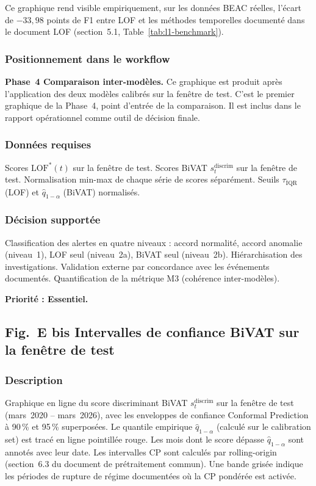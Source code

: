 \documentclass[12pt,a4paper]{article}
\begin{document}
Ce graphique rend visible empiriquement, sur les données BEAC réelles,
l'écart de $-33{,}98$ points de F1 entre LOF et les méthodes temporelles
documenté dans le document LOF (section~5.1, Table~\ref{tab:l1-benchmark}).

\subsubsection{Positionnement dans le workflow}

\textbf{Phase~4  Comparaison inter-modèles.} Ce graphique est produit
après l'application des deux modèles calibrés sur la fenêtre de test.
C'est le premier graphique de la Phase~4, point d'entrée de la comparaison.
Il est inclus dans le rapport opérationnel comme outil de décision finale.

\subsubsection{Données requises}

Scores $\mathrm{LOF}^*(t)$ sur la fenêtre de test. Scores BiVAT
$s^{\mathrm{discrim}}_t$ sur la fenêtre de test. Normalisation min-max
de chaque série de scores séparément. Seuils $\tau_{\mathrm{IQR}}$ (LOF)
et $\hat{q}_{1-\alpha}$ (BiVAT) normalisés.

\subsubsection{Décision supportée}

Classification des alertes en quatre niveaux : accord normalité, accord
anomalie (niveau~1), LOF seul (niveau~2a), BiVAT seul (niveau~2b).
Hiérarchisation des investigations. Validation externe par concordance
avec les événements documentés. Quantification de la métrique M3
(cohérence inter-modèles).

\textbf{Priorité : Essentiel.}

\subsection{Fig.~E bis  Intervalles de confiance BiVAT sur la fenêtre
de test}

\subsubsection{Description}

Graphique en ligne du score discriminant BiVAT $s^{\mathrm{discrim}}_t$
sur la fenêtre de test (mars~2020 -- mars~2026), avec les enveloppes de
confiance Conformal Prediction à 90\,\% et 95\,\% superposées. Le quantile
empirique $\hat{q}_{1-\alpha}$ (calculé sur le calibration set) est tracé
en ligne pointillée rouge. Les mois dont le score dépasse $\hat{q}_{1-\alpha}$
sont annotés avec leur date. Les intervalles CP sont calculés par rolling-origin
(section~6.3 du document de prétraitement commun). Une bande grisée indique
les périodes de rupture de régime documentées où la CP pondérée est activée.
\end{document}
